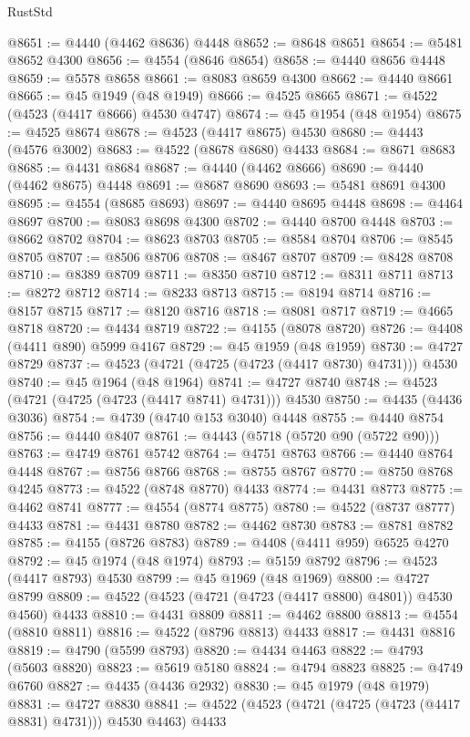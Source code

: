\begin{lexlean}{RustStd}
\begin{coremodule}
{\begin{coremodule}
{{{{{{{{{{{{{{{{{{{{{{{{{{{{{{{{{{{{{{{{{{{{{{{{{{{{{{{{{{{{@8651 := @4440 (@4462 @8636) @4448
@8652 := @8648 @8651
@8654 := @5481 @8652 @4300
@8656 := @4554 (@8646 @8654)
@8658 := @4440 @8656 @4448
@8659 := @5578 @8658
@8661 := @8083 @8659 @4300
@8662 := @4440 @8661
@8665 := @45 @1949 (@48 @1949)
@8666 := @4525 @8665
@8671 := @4522 (@4523 (@4417 @8666) @4530 @4747)
@8674 := @45 @1954 (@48 @1954)
@8675 := @4525 @8674
@8678 := @4523 (@4417 @8675) @4530
@8680 := @4443 (@4576 @3002)
@8683 := @4522 (@8678 @8680) @4433
@8684 := @8671 @8683
@8685 := @4431 @8684
@8687 := @4440 (@4462 @8666)
@8690 := @4440 (@4462 @8675) @4448
@8691 := @8687 @8690
@8693 := @5481 @8691 @4300
@8695 := @4554 (@8685 @8693)
@8697 := @4440 @8695 @4448
@8698 := @4464 @8697
@8700 := @8083 @8698 @4300
@8702 := @4440 @8700 @4448
@8703 := @8662 @8702
@8704 := @8623 @8703
@8705 := @8584 @8704
@8706 := @8545 @8705
@8707 := @8506 @8706
@8708 := @8467 @8707
@8709 := @8428 @8708
@8710 := @8389 @8709
@8711 := @8350 @8710
@8712 := @8311 @8711
@8713 := @8272 @8712
@8714 := @8233 @8713
@8715 := @8194 @8714
@8716 := @8157 @8715
@8717 := @8120 @8716
@8718 := @8081 @8717
@8719 := @4665 @8718
@8720 := @4434 @8719
@8722 := @4155 (@8078 @8720)
@8726 := @4408 (@4411 @890) @5999 @4167
@8729 := @45 @1959 (@48 @1959)
@8730 := @4727 @8729
@8737 := @4523 (@4721 (@4725 (@4723 (@4417 @8730) @4731))) @4530
@8740 := @45 @1964 (@48 @1964)
@8741 := @4727 @8740
@8748 := @4523 (@4721 (@4725 (@4723 (@4417 @8741) @4731))) @4530
@8750 := @4435 (@4436 @3036)
@8754 := @4739 (@4740 @153 @3040) @4448
@8755 := @4440 @8754
@8756 := @4440 @8407
@8761 := @4443 (@5718 (@5720 @90 (@5722 @90)))
@8763 := @4749 @8761 @5742
@8764 := @4751 @8763
@8766 := @4440 @8764 @4448
@8767 := @8756 @8766
@8768 := @8755 @8767
@8770 := @8750 @8768 @4245
@8773 := @4522 (@8748 @8770) @4433
@8774 := @4431 @8773
@8775 := @4462 @8741
@8777 := @4554 (@8774 @8775)
@8780 := @4522 (@8737 @8777) @4433
@8781 := @4431 @8780
@8782 := @4462 @8730
@8783 := @8781 @8782
@8785 := @4155 (@8726 @8783)
@8789 := @4408 (@4411 @959) @6525 @4270
@8792 := @45 @1974 (@48 @1974)
@8793 := @5159 @8792
@8796 := @4523 (@4417 @8793) @4530
@8799 := @45 @1969 (@48 @1969)
@8800 := @4727 @8799
@8809 := @4522 (@4523 (@4721 (@4723 (@4417 @8800) @4801)) @4530 @4560) @4433
@8810 := @4431 @8809
@8811 := @4462 @8800
@8813 := @4554 (@8810 @8811)
@8816 := @4522 (@8796 @8813) @4433
@8817 := @4431 @8816
@8819 := @4790 (@5599 @8793)
@8820 := @4434 @4463
@8822 := @4793 (@5603 @8820)
@8823 := @5619 @5180
@8824 := @4794 @8823
@8825 := @4749 @6760
@8827 := @4435 (@4436 @2932)
@8830 := @45 @1979 (@48 @1979)
@8831 := @4727 @8830
@8841 := @4522 (@4523 (@4721 (@4725 (@4723 (@4417 @8831) @4731))) @4530 @4463) @4433
}}}}}}}}}}}}}}}}}}}}}}}}}}}}}}}}}}}}}}}}}}}}}}}}}}}}}}}}}}}}
\end{coremodule}}
\end{coremodule}
\end{lexlean}
